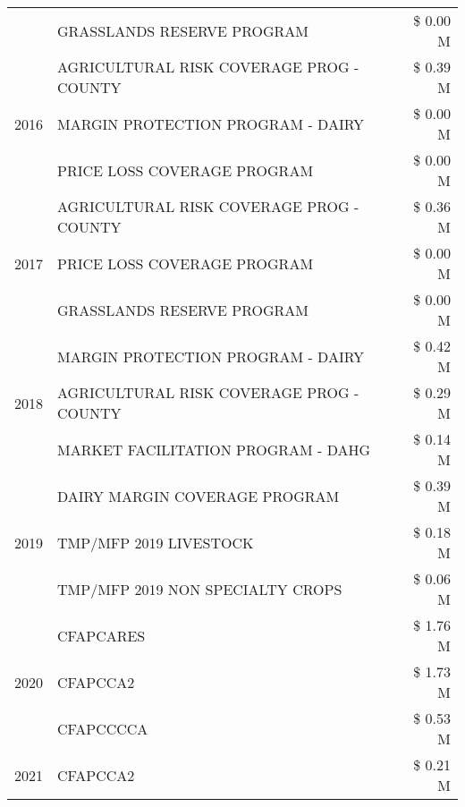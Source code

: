 \begin{tabular}{llr}
 & GRASSLANDS RESERVE PROGRAM & \$ 0.00 M \\
\cline{1-3}
\multirow[t]{3}{*}{2016} & AGRICULTURAL RISK COVERAGE PROG - COUNTY & \$ 0.39 M \\
 & MARGIN PROTECTION PROGRAM - DAIRY & \$ 0.00 M \\
 & PRICE LOSS COVERAGE PROGRAM & \$ 0.00 M \\
\cline{1-3}
\multirow[t]{3}{*}{2017} & AGRICULTURAL RISK COVERAGE PROG - COUNTY & \$ 0.36 M \\
 & PRICE LOSS COVERAGE PROGRAM & \$ 0.00 M \\
 & GRASSLANDS RESERVE PROGRAM & \$ 0.00 M \\
\cline{1-3}
\multirow[t]{3}{*}{2018} & MARGIN PROTECTION PROGRAM - DAIRY & \$ 0.42 M \\
 & AGRICULTURAL RISK COVERAGE PROG - COUNTY & \$ 0.29 M \\
 & MARKET FACILITATION PROGRAM - DAHG & \$ 0.14 M \\
\cline{1-3}
\multirow[t]{3}{*}{2019} & DAIRY MARGIN COVERAGE PROGRAM & \$ 0.39 M \\
 & TMP/MFP 2019 LIVESTOCK & \$ 0.18 M \\
 & TMP/MFP 2019 NON SPECIALTY CROPS & \$ 0.06 M \\
\cline{1-3}
\multirow[t]{3}{*}{2020} & CFAPCARES & \$ 1.76 M \\
 & CFAPCCA2 & \$ 1.73 M \\
 & CFAPCCCCA & \$ 0.53 M \\
\cline{1-3}
2021 & CFAPCCA2 & \$ 0.21 M \\
\cline{1-3}
\bottomrule
\end{tabular}
